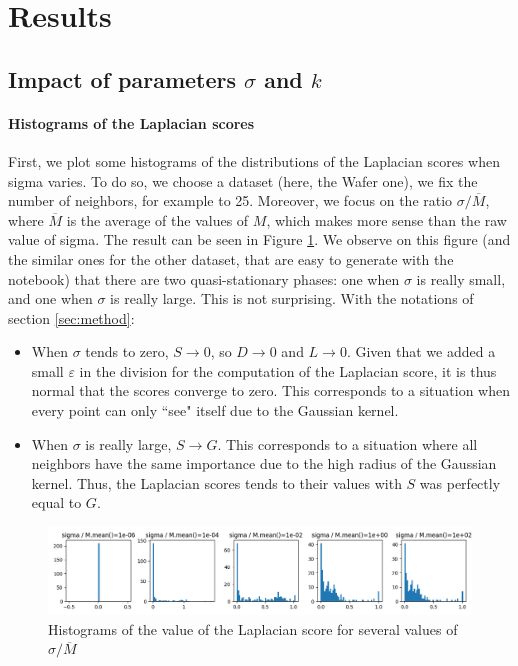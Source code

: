 \documentclass[11pt]{article}
\begin{document}
\newpage
\section{Results}

\subsection{Impact of parameters $\sigma$ and $k$} 

\paragraph{Histograms of the Laplacian scores} First, we plot some histograms of the distributions of the Laplacian scores when sigma varies. To do so, we choose a dataset (here, the Wafer one), we fix the number of neighbors, for example to 25. Moreover, we focus on the ratio $\sigma / \overline{M}$, where $\overline{M}$ is the average of the values of $M$, which makes more sense than the raw value of sigma. The result can be seen in Figure \ref{fig:sigma_histograms}. We observe on this figure (and the similar ones for the other dataset, that are easy to generate with the notebook) that there are two quasi-stationary phases: one when $\sigma$ is really small, and one when $\sigma$ is really large. This is not surprising. With the notations of section \ref{sec:method}:

\begin{itemize}
    \item When $\sigma$ tends to zero, $S \rightarrow 0$, so $D \rightarrow 0$ and $L \rightarrow 0$. Given that we added a small $\varepsilon$ in the division for the computation of the Laplacian score, it is thus normal that the scores converge to zero. This corresponds to a situation when every point can only ``see" itself due to the Gaussian kernel.
    \item When $\sigma$ is really large, $S \rightarrow G$. This corresponds to a situation where all neighbors have the same importance due to the high radius of the Gaussian kernel. Thus, the Laplacian scores tends to their values with $S$ was perfectly equal to $G$.
\end{itemize}

\begin{figure}
    \centering
    \includegraphics[width=\textwidth, keepaspectratio=True]{figures/laplacian_histograms.png}
    \caption{Histograms of the value of the Laplacian score for several values of $\sigma / \overline{M}$}
    \label{fig:sigma_histograms}
\end{figure}
\end{document}
